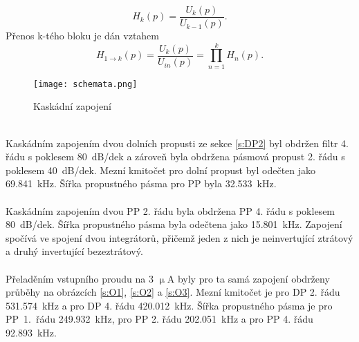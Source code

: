 \begin{equation}
H_k(p) = \frac{U_k (p)}{U_{k-1}(p)}.
\end{equation}
Přenos k-tého bloku je dán vztahem
\begin{equation}
H_{1 \rightarrow k}(p) = \frac{U_k (p)}{U_{in}(p)} = \prod _{n=1}^{k} H_n(p).
\end{equation}
\begin{figure}[h]
\centering
\texttt{[image: schemata.png]}
\caption[Kaskádní zapojení]{Kaskádní zapojení \cite{9}}
\end{figure}
\\
\noindent Kaskádním zapojením dvou dolních propusti ze sekce \ref{s:DP2} byl obdržen filtr 4. řádu s poklesem 80~dB/dek a zároveň byla obdržena pásmová propust 2. řádu s poklesem 40~dB/dek. Mezní kmitočet pro dolní propust byl odečten jako 69.841~kHz. Šířka propustného pásma pro PP byla 32.533~kHz. \\
\\
\noindent Kaskádním zapojením dvou PP 2. řádu byla obdržena PP 4. řádu s poklesem 80~dB/dek. Šířka propustného pásma byla odečtena jako 15.801~kHz. Zapojení spočívá ve spojení dvou integrátorů, přičemž jeden z nich je neinvertující ztrátový a druhý invertující bezeztrátový. \\
\\
\noindent Přeladěním vstupního proudu na 3 $\upmu$A byly pro ta samá zapojení obdrženy průběhy na obrázcích \ref{s:O1}, \ref{s:O2} a  \ref{s:O3}. Mezní kmitočet je pro DP 2. řádu 531.574~kHz a pro DP 4. řádu 420.012~kHz. Šířka propustného pásma je pro PP~1.~řádu 249.932~kHz, pro PP 2. řádu 202.051~kHz a pro PP 4. řádu 92.893~kHz.
